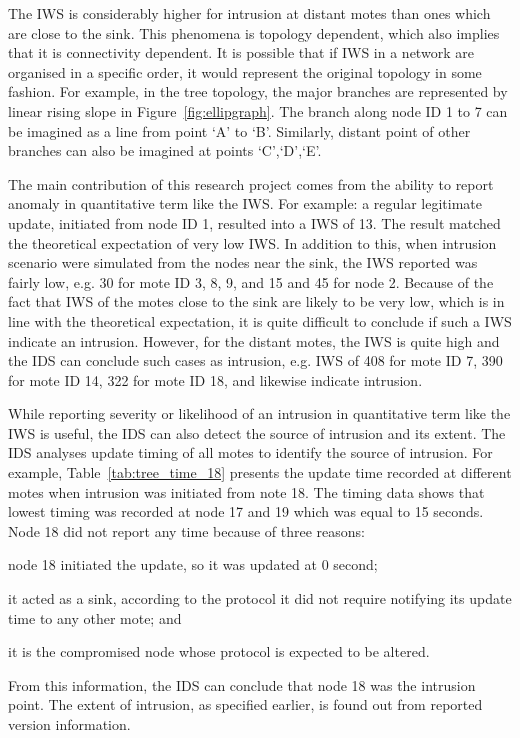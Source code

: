 \documentclass[conference,manuscript]{IEEEtran}
\begin{document}
The IWS is considerably higher for intrusion at distant motes than ones which are close to the sink.
This phenomena is topology dependent, which also implies  that it is connectivity dependent.
It is possible that if IWS in a network are organised in a specific order, it would represent the original topology in some fashion.
For example, in the tree topology, the major branches are represented by linear rising slope in Figure~\ref{fig:ellipgraph}.
The branch along node ID 1 to 7 can be imagined as a line from point `A' to `B'. Similarly, distant point of other branches can also be imagined at points `C',`D',`E'.


The main contribution of this research project comes from the ability to report anomaly in quantitative term like the IWS.
For example:  a regular legitimate update, initiated from node ID 1, resulted into a IWS of 13.
The result matched the theoretical expectation of very low IWS.
In addition to this, when intrusion scenario were simulated from the nodes near the sink, the IWS reported was fairly low, e.g. 30 for mote ID 3, 8, 9, and 15
 and 45 for node 2. 
Because of the fact that IWS of the motes close to the sink are likely to be very low, which is in line with the theoretical expectation, it is quite difficult to conclude if such a IWS indicate an intrusion. 
However, for the distant motes, the IWS is quite high and the IDS can conclude such cases as intrusion, e.g. IWS of 408 for mote ID 7, 390 for mote ID 14, 322 for mote ID 18, 
and likewise indicate intrusion.


While reporting severity or likelihood of an intrusion in quantitative term like the IWS is useful, the IDS can also detect the source of intrusion and its extent. 
The IDS analyses update timing of all motes to identify the source of intrusion. 
For example, Table~\ref{tab:tree_time_18} presents the update time recorded at different motes when intrusion was initiated from note 18.
The timing data shows that lowest timing was recorded at node 17 and 19 which was equal to 15 seconds.
Node 18 did not report any time because of three reasons: 
\begin{inparaenum}
\item node 18 initiated the update, so it was updated at $0$ second;
\item it acted as a sink, according to the protocol it did not require notifying its update time to any other mote; and 
\item it is the compromised node whose protocol is expected to be altered.
\end{inparaenum}
From this information, the IDS can conclude that node 18 was the intrusion point.
The extent of intrusion, as specified earlier, is found out from reported version information.
\end{document}
